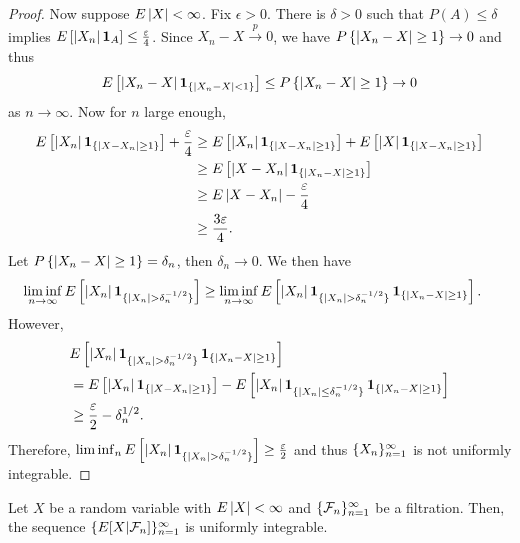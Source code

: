 \documentclass[a4paper]{article}
\newcommand{\convp}{\xrightarrow{p}}
\begin{document}
\begin{proof}
  Now suppose $E \left\lvert X\right\rvert < \infty$. Fix $\epsilon > 0$.
  There is $\delta > 0$ such that $P(A) \leq \delta$ implies
  $E \left[ \left\lvert X_n\right\rvert \operatorname{\mathbf{1}}_A \right] \leq \frac{\varepsilon}{4}$.
  Since $X_n - X \convp 0$, we have
  $P \left\{ \left\lvert X_n - X\right\rvert \geq 1 \right\} \to 0$
  and thus
  \[
    E \left[ \left\lvert X_n - X\right\rvert \operatorname{\mathbf{1}}_{\{\left\lvert X_n - X\right\rvert < 1\}}\right]
    \leq P \left\{ \left\lvert X_n - X\right\rvert \geq 1 \right\} \to 0
  \]
  as $n \to \infty$.
  Now for $n$ large enough,
  \begin{align*}
    E \left[ \left\lvert X_n\right\rvert \operatorname{\mathbf{1}}_{\{\left\lvert X - X_n\right\rvert \geq 1\}} \right] + \frac{\varepsilon}{4}
     & \geq E \left[ \left\lvert X_n\right\rvert \operatorname{\mathbf{1}}_{\{\left\lvert X - X_n\right\rvert \geq 1\}} \right]
    + E \left[ \left\lvert X\right\rvert \operatorname{\mathbf{1}}_{\{\left\lvert X - X_n\right\rvert \geq 1\}} \right]             \\
     & \geq E \left[ \left\lvert X - X_n\right\rvert \operatorname{\mathbf{1}}_{\{\left\lvert X_n - X\right\rvert \geq 1\}} \right] \\
     & \geq E \left\lvert X - X_n\right\rvert - \frac{\varepsilon}{4}                           \\
     & \geq \frac{3 \varepsilon}{4}.
  \end{align*}
  Let $P \left\{ \left\lvert X_n - X\right\rvert \geq 1 \right\} = \delta_n$, then
  $\delta_n \to 0$. We then have
  \begin{align*}
    \liminf_{n \to \infty} E \left[ \left\lvert X_n\right\rvert
                               \operatorname{\mathbf{1}}_{\{\left\lvert X_n\right\rvert > \delta_n^{-1/2}\}} \right]
     & \geq \liminf_{n \to \infty} E \left[ \left\lvert X_n\right\rvert \operatorname{\mathbf{1}}_{\{\left\lvert X_n\right\rvert > \delta_n^{-1/2}\}}
                                       \operatorname{\mathbf{1}}_{\{\left\lvert X_n - X\right\rvert \geq 1\}} \right].
  \end{align*}
  However,
  \begin{align*}
     & E \left[ \left\lvert X_n\right\rvert \operatorname{\mathbf{1}}_{\{\left\lvert X_n\right\rvert > \delta_n^{-1/2}\}}
           \operatorname{\mathbf{1}}_{\{\left\lvert X_n - X\right\rvert \geq 1\}} \right]     \\
     & = E \left[ \left\lvert X_n\right\rvert \operatorname{\mathbf{1}}_{\{\left\lvert X - X_n\right\rvert \geq 1\}} \right]
    - E \left[ \left\lvert X_n\right\rvert \operatorname{\mathbf{1}}_{\{\left\lvert X_n\right\rvert \leq \delta_n^{-1/2}\}}
          \operatorname{\mathbf{1}}_{\{\left\lvert X_n - X\right\rvert \geq 1\}} \right]   \\
     & \geq \frac{\varepsilon}{2} - \delta_n^{1/2}.
  \end{align*}
  Therefore, $\liminf_n E \left[ \left\lvert X_n\right\rvert \operatorname{\mathbf{1}}_{\{\left\lvert X_n\right\rvert
        > \delta_n^{-1/2}\}} \right] \geq \frac{\varepsilon}{2}$
  and thus $\{ X_n \}_{n=1}^\infty$ is not uniformly integrable.

\end{proof}

\begin{thm}
  Let $X$ be a random variable with $E \left\lvert X\right\rvert < \infty$ and
  $\{ \mathcal{F}_n \}_{n=1}^\infty$ be a filtration. Then, the sequence
  $\{ E [X | \mathcal{F}_n] \}_{n=1}^\infty$ is uniformly integrable.
\end{thm}
\end{document}
